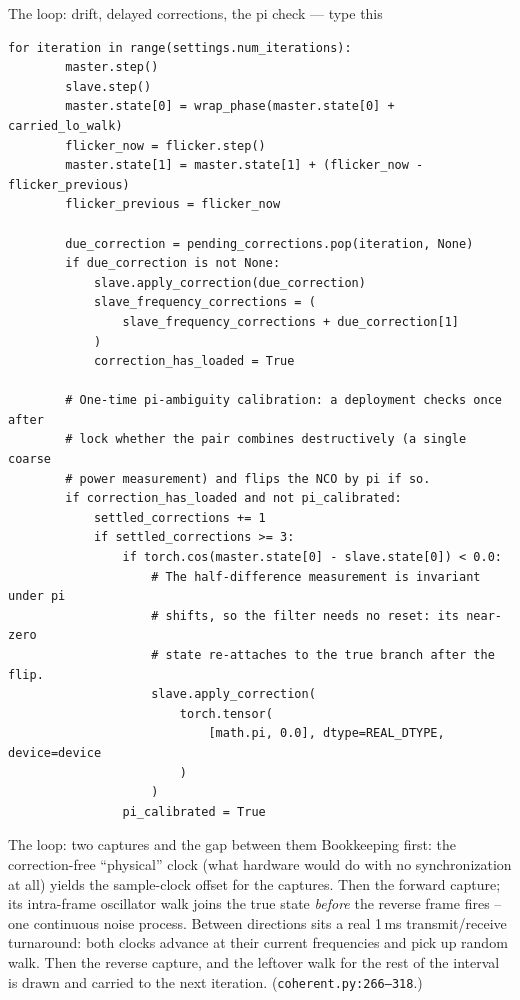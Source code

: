 \documentclass[10pt]{beamer}
\begin{document}
\begin{frame}[fragile]{The loop: drift, delayed corrections, the pi check --- type this}
\begin{lstlisting}[basicstyle=\ttfamily\tiny]
    for iteration in range(settings.num_iterations):
        master.step()
        slave.step()
        master.state[0] = wrap_phase(master.state[0] + carried_lo_walk)
        flicker_now = flicker.step()
        master.state[1] = master.state[1] + (flicker_now - flicker_previous)
        flicker_previous = flicker_now

        due_correction = pending_corrections.pop(iteration, None)
        if due_correction is not None:
            slave.apply_correction(due_correction)
            slave_frequency_corrections = (
                slave_frequency_corrections + due_correction[1]
            )
            correction_has_loaded = True

        # One-time pi-ambiguity calibration: a deployment checks once after
        # lock whether the pair combines destructively (a single coarse
        # power measurement) and flips the NCO by pi if so.
        if correction_has_loaded and not pi_calibrated:
            settled_corrections += 1
            if settled_corrections >= 3:
                if torch.cos(master.state[0] - slave.state[0]) < 0.0:
                    # The half-difference measurement is invariant under pi
                    # shifts, so the filter needs no reset: its near-zero
                    # state re-attaches to the true branch after the flip.
                    slave.apply_correction(
                        torch.tensor(
                            [math.pi, 0.0], dtype=REAL_DTYPE, device=device
                        )
                    )
                pi_calibrated = True
\end{lstlisting}
\end{frame}

\begin{frame}{The loop: two captures and the gap between them}
  Bookkeeping first: the correction-free ``physical'' clock
  (what hardware would do with no synchronization at all)
  yields the sample-clock offset for the captures. Then the
  forward capture; its intra-frame oscillator walk joins the
  true state \emph{before} the reverse frame fires -- one
  continuous noise process. Between directions sits a real
  1\,ms transmit/receive turnaround: both clocks advance at
  their current frequencies and pick up random walk. Then the
  reverse capture, and the leftover walk for the rest of the
  interval is drawn and carried to the next iteration.
  (\texttt{coherent.py:266--318}.)
\end{frame}
\end{document}
